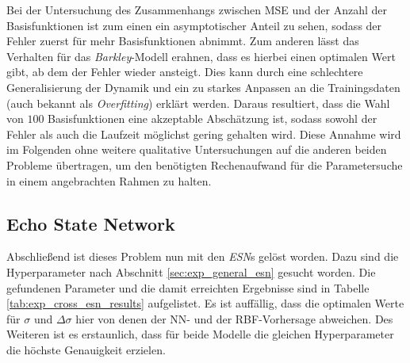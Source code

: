 Bei der Untersuchung des Zusammenhangs zwischen MSE und der Anzahl der Basisfunktionen ist zum einen ein asymptotischer Anteil zu sehen, sodass der Fehler zuerst für mehr Basisfunktionen abnimmt. Zum anderen lässt das Verhalten für das \textit{Barkley}-Modell erahnen, dass es hierbei einen optimalen Wert gibt, ab dem der Fehler wieder ansteigt. Dies kann durch eine schlechtere Generalisierung der Dynamik und ein zu starkes Anpassen an die Trainingsdaten (auch bekannt als \textit{Overfitting}) erklärt werden. Daraus resultiert, dass die Wahl von $100$ Basisfunktionen eine akzeptable Abschätzung ist, sodass sowohl der Fehler als auch die Laufzeit möglichst gering gehalten wird. Diese Annahme wird im Folgenden ohne weitere qualitative Untersuchungen auf die anderen beiden Probleme übertragen, um den benötigten Rechenaufwand für die Parametersuche in einem angebrachten Rahmen zu halten.  

\FloatBarrier
\clearpage
\subsection{Echo State Network}
Abschließend ist dieses Problem nun mit den \textit{ESN}s gelöst worden. Dazu sind die Hyperparameter nach Abschnitt \ref{sec:exp_general_esn} gesucht worden. Die gefundenen Parameter und die damit erreichten Ergebnisse sind in Tabelle \ref{tab:exp_cross_esn_results} aufgelistet. Es ist auffällig, dass die optimalen Werte für $\sigma$ und $\Delta \sigma$ hier von denen der NN- und der RBF-Vorhersage abweichen. Des Weiteren ist es erstaunlich, dass für beide Modelle die gleichen Hyperparameter die höchste Genauigkeit erzielen. \\

